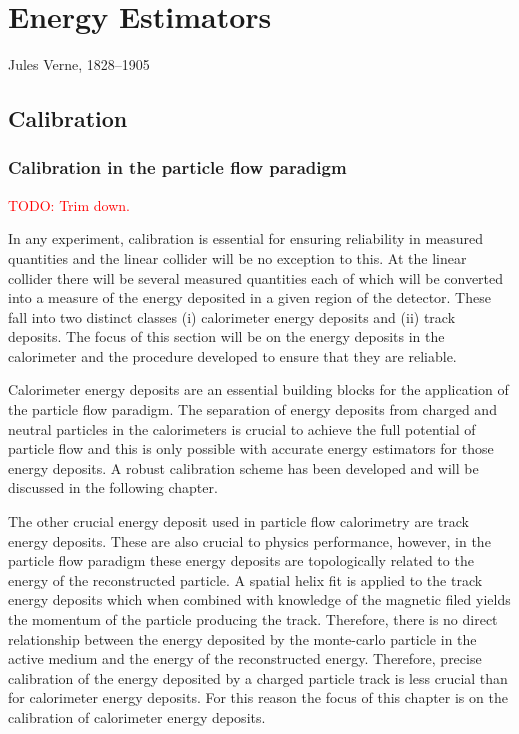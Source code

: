 \chapter{Energy Estimators}
\label{chap:MoreStuff}

{Jules Verne, 1828--1905}


\section{Calibration}


\subsection{Calibration in the particle flow paradigm}

\textcolor{red}{TODO: Trim down.}

In any experiment, calibration is essential for ensuring reliability in measured quantities and the linear collider will be no exception to this.  At the linear collider there will be several measured quantities each of which will be converted into a measure of the energy deposited in a given region of the detector.  These fall into two distinct classes (i) calorimeter energy deposits and (ii) track deposits.  The focus of this section will be on the energy deposits in the calorimeter and the procedure developed to ensure that they are reliable.  

Calorimeter energy deposits are an essential building blocks for the application of the particle flow paradigm.  The separation of energy deposits from charged and neutral particles in the calorimeters is crucial to achieve the full potential of particle flow and this is only possible with accurate energy estimators for those energy deposits.  A robust calibration scheme has been developed and will be discussed in the following chapter. 

The other crucial energy deposit used in particle flow calorimetry are track energy deposits.  These are also crucial to physics performance, however, in the particle flow paradigm these energy deposits are topologically related to the energy of the reconstructed particle.  A spatial helix fit is applied to the track energy deposits which when combined with knowledge of the magnetic filed yields the momentum of the particle producing the track.  Therefore, there is no direct relationship between the energy deposited by the monte-carlo particle in the active medium and the energy of the reconstructed energy.  Therefore, precise calibration of the energy deposited by a charged particle track is less crucial than for calorimeter energy deposits.  For this reason the focus of this chapter is on the calibration of calorimeter energy deposits. 

